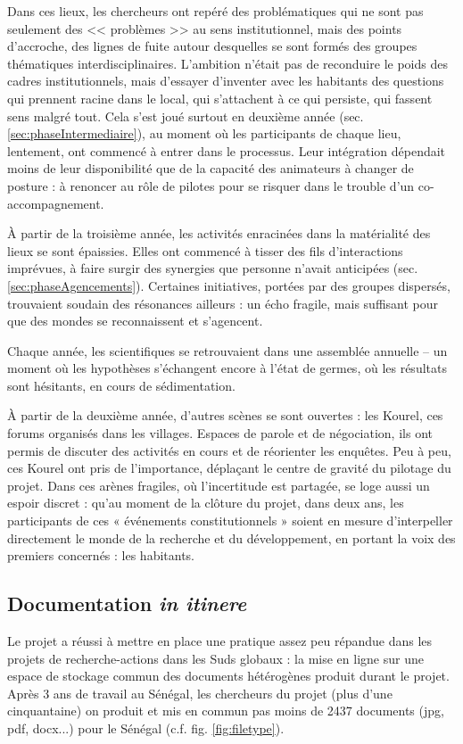 \documentclass{article}
\begin{document}
Dans ces lieux, les chercheurs ont repéré des problématiques qui ne sont pas seulement des << problèmes >> au sens institutionnel, mais des points d’accroche, des lignes de fuite autour desquelles se sont formés des groupes thématiques interdisciplinaires. L’ambition n’était pas de reconduire le poids des cadres institutionnels, mais d'essayer d'inventer avec les habitants des questions qui prennent racine dans le local, qui s’attachent à ce qui persiste, qui fassent sens malgré tout. Cela s’est joué surtout en deuxième année (sec. \ref{sec:phaseIntermediaire}), au moment où les participants de chaque lieu, lentement, ont commencé à entrer dans le processus. Leur intégration dépendait moins de leur disponibilité que de la capacité des animateurs à changer de posture : à renoncer au rôle de pilotes pour se risquer dans le trouble d’un co-accompagnement.

À partir de la troisième année, les activités enracinées dans la matérialité des lieux se sont épaissies. Elles ont commencé à tisser des fils d’interactions imprévues, à faire surgir des synergies que personne n’avait anticipées (sec. \ref{sec:phaseAgencements}). Certaines initiatives, portées par des groupes dispersés, trouvaient soudain des résonances ailleurs : un écho fragile, mais suffisant pour que des mondes se reconnaissent et s’agencent.

Chaque année, les scientifiques se retrouvaient dans une assemblée annuelle -- un moment où les hypothèses s’échangent encore à l’état de germes, où les résultats sont hésitants, en cours de sédimentation.

À partir de la deuxième année, d’autres scènes se sont ouvertes : les Kourel, ces forums organisés dans les villages. Espaces de parole et de négociation, ils ont permis de discuter des activités en cours et de réorienter les enquêtes. Peu à peu, ces Kourel ont pris de l’importance, déplaçant le centre de gravité du pilotage du projet. Dans ces arènes fragiles, où l’incertitude est partagée, se loge aussi un espoir discret : qu’au moment de la clôture du projet, dans deux ans, les participants de ces « événements constitutionnels » soient en mesure d’interpeller directement le monde de la recherche et du développement, en portant la voix des premiers concernés : les habitants.

\subsection{Documentation \textit{in itinere}}
Le projet a réussi à mettre en place une pratique assez peu répandue dans les projets de recherche-actions dans les Suds globaux : la mise en ligne sur une espace de stockage commun des documents hétérogènes produit durant le projet. Après 3 ans de travail au Sénégal, les chercheurs du projet (plus d'une cinquantaine) on produit et mis en commun pas moins de 2437 documents (jpg, pdf, docx...) pour le Sénégal (c.f. fig. \ref{fig:filetype}).
\end{document}
